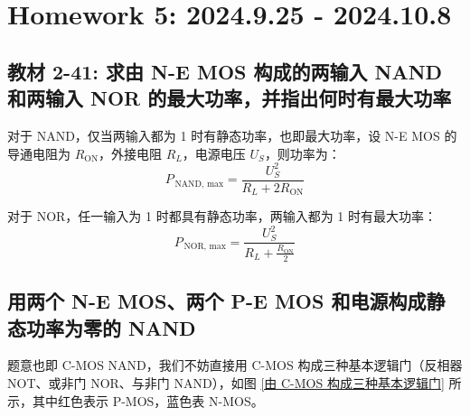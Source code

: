 \documentclass[UTF8]{report}
\theoremstyle{MyLineTheoremStyle} %
\theoremstyle{MyBlockTheoremStyle} %
\theoremstyle{MySubsubsectionStyle} %
\begin{document}
\chapter{Homework 5: 2024.9.25 - 2024.10.8}\thispagestyle{fancy}

\section{教材 2-41: 求由 N-E MOS 构成的两输入 NAND 和两输入 NOR 的最大功率，并指出何时有最大功率}

对于 NAND，仅当两输入都为 1 时有静态功率，也即最大功率，设 N-E MOS 的导通电阻为 $R_{\text{ON}}$，外接电阻 $R_L$，电源电压 $U_S$，则功率为：
\begin{equation}
    P_{\,\text{NAND, max}} = \frac{U_S^2}{R_L + 2R_{\text{ON}}}
\end{equation}

对于 NOR，任一输入为 1 时都具有静态功率，两输入都为 1 时有最大功率：
\begin{equation}
    P_{\,\text{NOR, max}} = \frac{U_S^2}{R_L + \frac{R_{\text{ON}}}{2}}
\end{equation}

\section{用两个 N-E MOS、两个 P-E MOS 和电源构成静态功率为零的 NAND}

题意也即 C-MOS NAND，我们不妨直接用 C-MOS 构成三种基本逻辑门（反相器 NOT、或非门 NOR、与非门 NAND），如图 \ref{由 C-MOS 构成三种基本逻辑门} 所示，其中红色表示 P-MOS，蓝色表 N-MOS。
\end{document}
